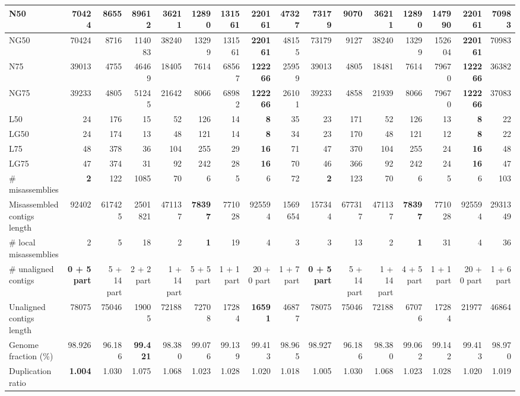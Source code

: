\documentclass[12pt,a4paper]{article}
\begin{document}
\begin{table}[ht]
\begin{center}
\begin{tabular}{|l*{15}{|r}|}
N50 & 70424 & 8655 & 89612 & 36211 & 12890 & 131561 & {\bf 220161} & 47327 & 73179 & 9070 & 36211 & 12890 & 147990 & {\bf 220161} & 70983 \\ \hline
NG50 & 70424 & 8716 & 114083 & 38240 & 13299 & 131561 & {\bf 220161} & 48155 & 73179 & 9127 & 38240 & 13299 & 152604 & {\bf 220161} & 70983 \\ \hline
N75 & 39013 & 4755 & 46469 & 18405 & 7614 & 68567 & {\bf 122266} & 25959 & 39013 & 4805 & 18481 & 7614 & 79670 & {\bf 122266} & 36382 \\ \hline
NG75 & 39233 & 4805 & 51245 & 21642 & 8066 & 68982 & {\bf 122266} & 26101 & 39233 & 4858 & 21939 & 8066 & 79670 & {\bf 122266} & 37083 \\ \hline
L50 & 24 & 176 & 15 & 52 & 126 & 14 & {\bf 8} & 35 & 23 & 171 & 52 & 126 & 13 & {\bf 8} & 22 \\ \hline
LG50 & 24 & 174 & 13 & 48 & 121 & 14 & {\bf 8} & 34 & 23 & 170 & 48 & 121 & 12 & {\bf 8} & 22 \\ \hline
L75 & 48 & 378 & 36 & 104 & 255 & 29 & {\bf 16} & 71 & 47 & 370 & 104 & 255 & 24 & {\bf 16} & 48 \\ \hline
LG75 & 47 & 374 & 31 & 92 & 242 & 28 & {\bf 16} & 70 & 46 & 366 & 92 & 242 & 24 & {\bf 16} & 47 \\ \hline
\# misassemblies & {\bf 2} & 122 & 1085 & 70 & 6 & 5 & 6 & 72 & {\bf 2} & 123 & 70 & 6 & 5 & 6 & 103 \\ \hline
Misassembled contigs length & 92402 & 617425 & 2501821 & 471137 & {\bf 78397} & 771028 & 925594 & 1569654 & 157344 & 677317 & 471137 & {\bf 78397} & 771028 & 925594 & 2931349 \\ \hline
\# local misassemblies & 2 & 5 & 18 & 2 & {\bf 1} & 19 & 4 & 3 & 3 & 13 & 2 & {\bf 1} & 31 & 4 & 36 \\ \hline
\# unaligned contigs & {\bf 0 + 5 part} & 5 + 14 part & 2 + 2 part & 1 + 14 part & 5 + 5 part & 1 + 1 part & 20 + 0 part & 1 + 7 part & {\bf 0 + 5 part} & 5 + 14 part & 1 + 14 part & 4 + 5 part & 1 + 1 part & 20 + 0 part & 1 + 6 part \\ \hline
Unaligned contigs length & 78075 & 75046 & 19005 & 72188 & 72708 & 17284 & {\bf 16591} & 46877 & 78075 & 75046 & 72188 & 67076 & 17284 & 21977 & 46864 \\ \hline
Genome fraction (\%) & 98.926 & 96.186 & {\bf 99.421} & 98.380 & 99.076 & 99.139 & 99.413 & 98.965 & 98.927 & 96.186 & 98.380 & 99.062 & 99.142 & 99.413 & 98.970 \\ \hline
Duplication ratio & {\bf 1.004} & 1.030 & 1.075 & 1.068 & 1.023 & 1.028 & 1.020 & 1.018 & 1.005 & 1.030 & 1.068 & 1.023 & 1.028 & 1.020 & 1.019 \\ \hline

\end{tabular}
\end{center}
\end{table}
\end{document}
